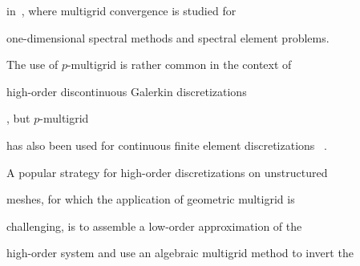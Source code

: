 \documentclass[smallcondensed,final]{svjour3}     %
\newcommand{\todo}[1]{\textcolor{red}{ #1}}
\begin{document}
in~\cite{MadayMunoz88}, where multigrid convergence is studied for

one-dimensional spectral methods and spectral element problems.



%

The use of $p$-multigrid is rather common in the context of

high-order discontinuous Galerkin discretizations

\cite{FidkowskiOliverLuEtAl05, HelenbrookAtkins06}, but $p$-multigrid

has also been used for continuous finite element discretizations ~\cite{HelenbrookMavriplisAtkins03}.




%





%




%




%

A popular strategy for high-order discretizations on unstructured

meshes, for which the application of geometric multigrid is

challenging, is to assemble a low-order approximation of the

high-order system and use an algebraic multigrid method to invert the
\end{document}

